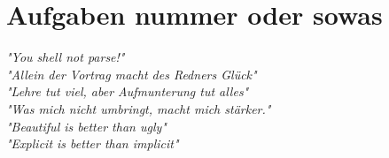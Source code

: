 \documentclass{article}
\begin{document}
	

	\section* {Aufgaben nummer oder sowas}
	
	\textit{"You shell not parse!"} \hfill \cite{2015} \\
	\textit{"Allein der Vortrag macht des Redners Glück"} \hfill \cite{2019} \\
	\textit{"Lehre tut viel, aber Aufmunterung tut alles"} \hfill \cite{2015} \\
	\textit{"Was mich nicht umbringt, macht mich stärker."} \hfill \cite[see][chap.~2]{2015} \\
	\textit{"Beautiful is better than ugly"} \hfill \cite*{2019} \\
	\textit{"Explicit is better than implicit"} \hfill \cite{2016,2019} \\	
	\printbibliography
	
\end{document}
